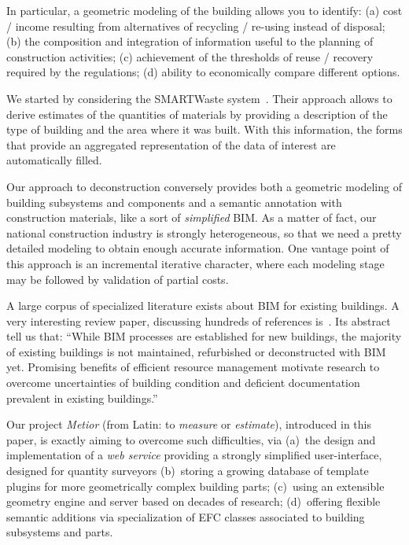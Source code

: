 In particular, a  geometric modeling of the building allows you to identify:
(a) cost / income resulting from alternatives of recycling / re-using instead of disposal;
(b) the composition and integration of information useful to the planning of construction activities;
(c) achievement of the thresholds of reuse / recovery required by the regulations;
(d) ability to economically compare different options.

We started by considering the SMARTWaste system~\cite{smartWaste}. Their approach allows to derive estimates of the quantities of materials by providing a description of the type of building and the area where it was built. With this information, the forms that provide an aggregated representation of the data of interest are automatically filled.

Our approach to deconstruction conversely provides both a geometric modeling of building subsystems and components and a semantic annotation with construction materials, like a sort of \emph{simplified} BIM. As a matter of fact, our national construction industry is strongly heterogeneous, so that  we need a pretty detailed modeling to obtain enough accurate information.
One vantage point of this approach is an incremental iterative character, where each modeling stage may be followed by validation of partial costs.

 
A large corpus of specialized literature exists about BIM for existing buildings. A very interesting review paper, discussing hundreds of references is~\cite{Volk2014109}. Its abstract tell us that:  ``While BIM processes are established for new buildings, the majority of existing buildings is not maintained, refurbished or deconstructed with BIM yet. Promising benefits of efficient resource management motivate research to overcome uncertainties of building condition and deficient documentation prevalent in existing buildings.''

Our project \emph{Metior} (from Latin: to  \emph{measure} or  \emph{estimate}), introduced in this paper, is exactly aiming to overcome such difficulties, via (a)~the design and implementation of a \emph{web service} providing a strongly simplified user-interface, designed for quantity surveyors (b)~storing a growing database of template plugins for more geometrically complex building parts; (c)~using an extensible geometry engine and server based on decades of research; (d)~offering flexible semantic additions via specialization of EFC classes associated to building subsystems and parts.


